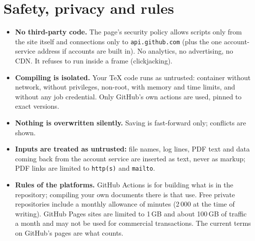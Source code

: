 \documentclass[11pt,a4paper]{article}
\newcommand{\fpath}[1]{\texttt{\small #1}}
\begin{document}
\section{Safety, privacy and rules}
\begin{itemize}
  \item \textbf{No third-party code.} The page's security policy allows scripts only from the site itself and connections only to \fpath{api.github.com} (plus the one account-service address if
        accounts are built in). No analytics, no advertising, no CDN. It refuses to run inside a frame (clickjacking).
  \item \textbf{Compiling is isolated.} Your \TeX{} code runs as untrusted: container without network, without privileges, non-root, with memory and time limits, and without any job credential.
        Only GitHub's own actions are used, pinned to exact versions.
  \item \textbf{Nothing is overwritten silently.} Saving is fast-forward only; conflicts are shown.
  \item \textbf{Inputs are treated as untrusted:} file names, log lines, PDF text and data coming back from the account service are inserted as text, never as markup; PDF links are limited to
        \texttt{http(s)} and \texttt{mailto}.
  \item \textbf{Rules of the platforms.} GitHub Actions is for building what is in the repository; compiling your own documents there is that use. Free private repositories include a monthly
        allowance of minutes (2\,000 at the time of writing). GitHub Pages sites are limited to 1\,GB and about 100\,GB of traffic a month and may not be used for commercial transactions. The
        current terms on GitHub's pages are what counts.
\end{itemize}
\end{document}
